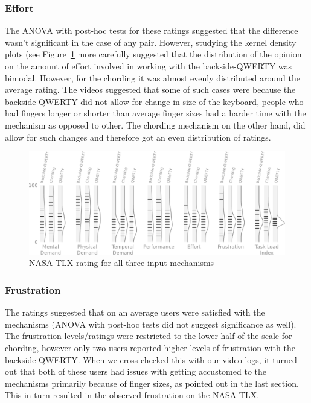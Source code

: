 \subsubsection{Effort}

The ANOVA with post-hoc tests for these ratings suggested that the difference wasn't significant in the case of any pair. However, studying the kernel density plots (see
Figure~\ref{fig:tlx-ratings} more carefully suggested that the
distribution of the opinion on the amount of effort involved in
working with the backside-QWERTY was bimodal. However, for the
chording it was almost evenly distributed around the average
rating. The videos suggested that some of such cases were because the
backside-QWERTY did not allow for change in size of the keyboard,
people who had fingers longer or shorter than average finger sizes had
a harder time with the mechanism as opposed to other. The chording
mechanism on the other hand, did allow for such changes and therefore
got an even distribution of ratings.

\begin{figure}
    \includegraphics[width=\textwidth]{Figures/hash_and_densities_index.pdf} 
    \caption{NASA-TLX rating for all three input mechanisms}
    \label{fig:tlx-ratings}
\end{figure}


\subsubsection{Frustration}

The ratings suggested that on an average users were satisfied with the
mechanisms (ANOVA with post-hoc tests did not suggest significance as well). The frustration levels/ratings were restricted to the
lower half of the scale for chording, however only two users reported
higher levels of frustration with the backside-QWERTY. When we
cross-checked this with our video logs, it turned out that both of
these users had issues with getting accustomed to the mechanisms
primarily because of finger sizes, as pointed out in the last
section. This in turn resulted in the observed frustration on the
NASA-TLX.

